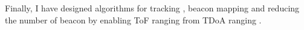 \documentclass[10pt]{article}
\begin{document}
Finally, I have designed algorithms for tracking \cite{lazik2015alps}, beacon mapping \cite{lazik2015alps,mobileAR} and reducing the number of beacon by enabling ToF ranging from TDoA ranging \cite{rtas-alps-platform}.\\




\end{document}
